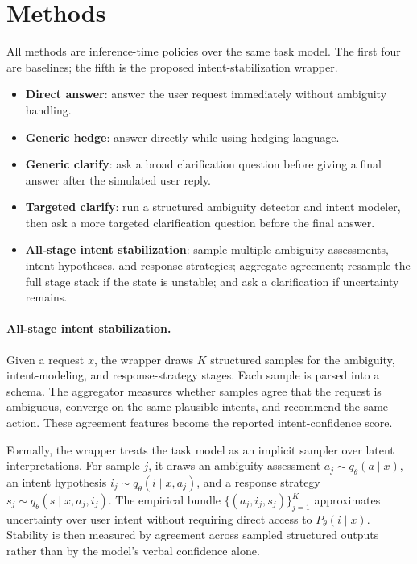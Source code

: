 \section{Methods}

All methods are inference-time policies over the same task model. The first four are baselines; the fifth is the proposed intent-stabilization wrapper.

\begin{itemize}
\item \textbf{Direct answer}: answer the user request immediately without ambiguity handling.
\item \textbf{Generic hedge}: answer directly while using hedging language.
\item \textbf{Generic clarify}: ask a broad clarification question before giving a final answer after the simulated user reply.
\item \textbf{Targeted clarify}: run a structured ambiguity detector and intent modeler, then ask a more targeted clarification question before the final answer.
\item \textbf{All-stage intent stabilization}: sample multiple ambiguity assessments, intent hypotheses, and response strategies; aggregate agreement; resample the full stage stack if the state is unstable; and ask a clarification if uncertainty remains.
\end{itemize}

\paragraph{All-stage intent stabilization.}
Given a request \(x\), the wrapper draws \(K\) structured samples for the ambiguity, intent-modeling, and response-strategy stages. Each sample is parsed into a schema. The aggregator measures whether samples agree that the request is ambiguous, converge on the same plausible intents, and recommend the same action. These agreement features become the reported intent-confidence score.

Formally, the wrapper treats the task model as an implicit sampler over latent interpretations. For sample \(j\), it draws an ambiguity assessment \(a_j \sim q_\theta(a \mid x)\), an intent hypothesis \(i_j \sim q_\theta(i \mid x, a_j)\), and a response strategy \(s_j \sim q_\theta(s \mid x, a_j, i_j)\). The empirical bundle \(\{(a_j,i_j,s_j)\}_{j=1}^K\) approximates uncertainty over user intent without requiring direct access to \(P_\theta(i \mid x)\). Stability is then measured by agreement across sampled structured outputs rather than by the model's verbal confidence alone.

